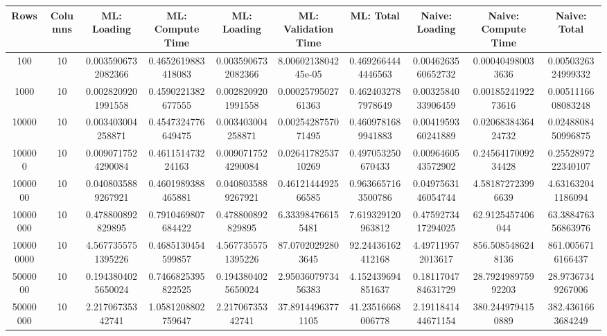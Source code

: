 \begin{table}[htb]
    \centering
    \begin{tabular}{@{}cccccccccc@{}}
        \toprule
        Rows & Columns & ML: Loading & ML: Compute Time & ML: Loading & ML: Validation Time & ML: Total & Naive: Loading & Naive: Compute Time & Naive: Total \\
        \midrule
        100 & 10 & 0.0035906732082366 & 0.4652619883418083 & 0.0035906732082366 & 8.0060213804245e-05 & 0.4692664444446563 & 0.0046263560652732 & 0.000404980033636 & 0.0050326324999332 \\
        1000 & 10 & 0.0028209201991558 & 0.4590221382677555 & 0.0028209201991558 & 0.0002579502761363 & 0.4624032787978649 & 0.0032584033906459 & 0.0018524192273616 & 0.0051116608083248 \\
        10000 & 10 & 0.003403004258871 & 0.4547324776649475 & 0.003403004258871 & 0.0025428757071495 & 0.4609781689941883 & 0.0041959360241889 & 0.0206838436424732 & 0.0248808450996875 \\
        100000 & 10 & 0.0090717524290084 & 0.461151473224163 & 0.0090717524290084 & 0.0264178253710269 & 0.497053250670433 & 0.0096460543572902 & 0.2456417009234428 & 0.2552897222340107 \\
        1000000 & 10 & 0.0408035889267921 & 0.4601989388465881 & 0.0408035889267921 & 0.4612144492566585 & 0.9636657163500786 & 0.0497563146054744 & 4.581872723996639 & 4.631632041186094 \\
        10000000 & 10 & 0.478800892829895 & 0.7910469807684422 & 0.478800892829895 & 6.333984766155481 & 7.619329120963812 & 0.4759273417294025 & 62.9125457406044 & 63.388476356863976 \\
        100000000 & 10 & 4.5677355751395226 & 0.4685130454599857 & 4.5677355751395226 & 87.07020292803645 & 92.24436162412168 & 4.497119572013617 & 856.5085486248136 & 861.0056716166437 \\
        5000000 & 10 & 0.1943804025650024 & 0.7466825395822525 & 0.1943804025650024 & 2.9503607973456383 & 4.152439694851637 & 0.1811704784631729 & 28.792498975992203 & 28.97367349267006 \\
        50000000 & 10 & 2.21706735342741 & 1.0581208802759647 & 2.21706735342741 & 37.89144963771105 & 41.23516668006778 & 2.1911841444671154 & 380.2449794150889 & 382.4361663684249 \\
        \bottomrule
    \end{tabular}
\end{table}